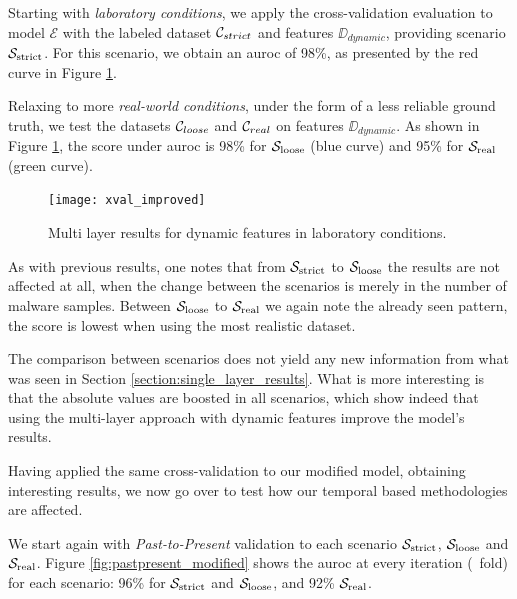 Starting with \textit{laboratory conditions}, we apply the cross-validation evaluation to model $\mathcal{E}$ with the labeled dataset $\mathcal{C}_{strict}$ and features $\DD_{dynamic}$, providing scenario $\mathcal{S}_{\mathrm{strict}}$.
For this scenario, we obtain an \gls{auroc} of 98\%, as presented by the red curve in Figure \ref{fig:improved_xval}.

Relaxing to more \textit{real-world conditions}, under the form of a less reliable ground truth, we test the datasets $\mathcal{C}_{loose}$ and $\mathcal{C}_{real}$ on features $\DD_{dynamic}$.
As shown in Figure \ref{fig:improved_xval}, the score under \gls{auroc} is 98\% for $\mathcal{S}_{\mathrm{loose}}$ (blue curve) and 95\% for $\mathcal{S}_{\mathrm{real}}$ (green curve).

\begin{figure}[!h]
	\centering
	\texttt{[image: xval\_improved]}
	\caption{Multi layer results for dynamic features in laboratory conditions.}
	\label{fig:improved_xval}
\end{figure}


As with previous results, one notes that from $\mathcal{S}_{\mathrm{strict}}$ to $\mathcal{S}_{\mathrm{loose}}$ the results are not affected at all, when the change between the scenarios is merely in the number of malware samples.
Between $\mathcal{S}_{\mathrm{loose}}$ to $\mathcal{S}_{\mathrm{real}}$ we again note the already seen pattern, the score is lowest when using the most realistic dataset.

The comparison between scenarios does not yield any new information from what was seen in Section \ref{section:single_layer_results}.
What is more interesting is that the absolute values are boosted in all scenarios, which show indeed that using the multi-layer approach with dynamic features improve the model's results.

Having applied the same cross-validation to our modified model, obtaining interesting results, we now go over to test how our temporal based methodologies are affected.

\medskip

We start again with \textit{Past-to-Present} validation to each scenario $\mathcal{S}_{\mathrm{strict}}$, $\mathcal{S}_{\mathrm{loose}}$ and $\mathcal{S}_{\mathrm{real}}$.
Figure \ref{fig:pastpresent_modified} shows the \gls{auroc} at every iteration (\ie\ fold) for each scenario: 96\% for $\mathcal{S}_{\mathrm{strict}}$ and $\mathcal{S}_{\mathrm{loose}}$, and 92\% $\mathcal{S}_{\mathrm{real}}$.

